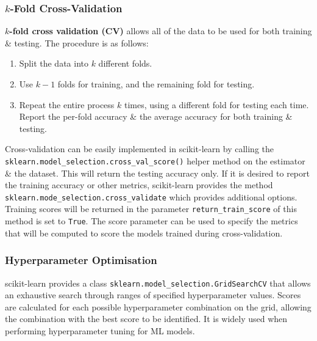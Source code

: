 \documentclass[a4paper,11pt]{article}
\begin{document}
\subsubsection{$k$-Fold Cross-Validation}
\textbf{$k$-fold cross validation (CV)} allows all of the data to be used for both training \& testing.
The procedure is as follows:
\begin{enumerate}
    \item   Split the data into $k$ different folds.
    \item   Use $k-1$ folds for training, and the remaining fold for testing.
    \item   Repeat the entire process $k$ times, using a different fold for testing each time.
            Report the per-fold accuracy \& the average accuracy for both training \& testing.
\end{enumerate}

Cross-validation can be easily implemented in scikit-learn by calling the \texttt{sklearn.model_selection.cross_val_score()} helper method on the estimator \& the dataset.
This will return the testing accuracy only.
If it is desired to report the training accuracy or other metrics, scikit-learn provides the method \texttt{sklearn.mode_selection.cross_validate} which provides additional options.
Training scores will be returned in the parameter \texttt{return_train_score} of this method is set to \texttt{True}.
The score parameter can be used to specify the metrics that will be computed to score the models trained during cross-validation.

\subsubsection{Hyperparameter Optimisation}
scikit-learn provides a class \texttt{sklearn.model_selection.GridSearchCV} that allows an exhaustive search through ranges of specified hyperparameter values.
Scores are calculated for each possible hyperparameter combination on the grid, allowing the combination with the best score to be identified.
It is widely used when performing hyperparameter tuning for ML models.
\end{document}
